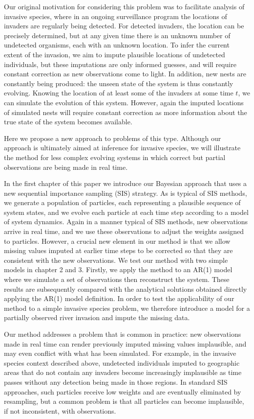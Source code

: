 Our original motivation for considering this problem was to facilitate analysis of invasive species, where in an ongoing surveillance program the locations of invaders are regularly being detected. For detected invaders, the location can be precisely determined, but at any given time there is an unknown number of undetected organisms, each with an unknown location. To infer the current extent of the invasion, we aim to impute plausible locations of undetected individuals, but these imputations are only informed guesses, and will require constant correction as new observations come to light. In addition, new nests are constantly being produced: the unseen state of the system is thus constantly evolving. Knowing the location of at least some of the invaders at some time $t$, we can simulate the evolution of this system. However, again the imputed locations of simulated nests will require constant correction as more information about the true state of the system becomes available.

Here we propose a new approach to problems of this type. Although our approach is ultimately aimed at inference for invasive species, we will illustrate the method for less complex evolving systems in which correct but partial observations are being made in real time.

In the first chapter of this paper we introduce our Bayesian approach that uses a new sequential importance sampling (SIS) strategy. As is typical of SIS methods, we generate a population of particles, each representing a plausible sequence of system states, and we evolve each particle at each time step according to a model of system dynamics. Again in a manner typical of SIS methods, new observations arrive in real time, and we use these observations to adjust the weights assigned to particles. However, a crucial new element in our method is that we allow missing values imputed at earlier time steps to be corrected so that they are consistent with the new observations. We test our method with two simple models in chapter 2 and 3. Firstly, we apply the method to an AR(1) model where we simulate a set of observations then reconstruct the system. These results are subsequently compared with the analytical solutions obtained directly applying the AR(1) model definition. In order to test the applicability of our method to a simple invasive species problem, we therefore introduce a model for a partially observed river invasion and impute the missing data.

Our method addresses a problem that is common in practice: new observations made in real time can render previously imputed missing values implausible, and may even conflict with what has been simulated. For example, in the invasive species context described above, undetected individuals imputed to geographic areas that do not contain any invaders become increasingly implausible as time passes without any detection being made in those regions. In standard SIS approaches, such particles receive low weights and are eventually eliminated by resampling, but a common problem is that all particles can become implausible, if not inconsistent, with observations.

